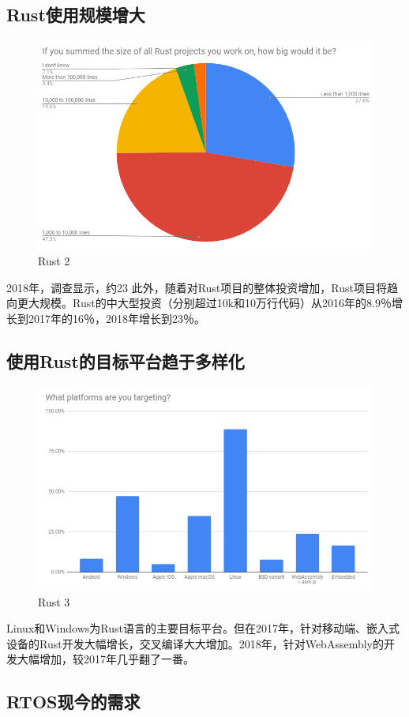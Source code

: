 \documentclass[12pt, a4paper]{article}
\begin{document}
	\subsection{Rust使用规模增大}
	
	\begin{figure}[H]
		\centering
		\includegraphics[width=0.7\linewidth]{n2}
		\caption{Rust 2}
		\label{fig:n2}
	\end{figure}
	2018年，调查显示，约23%
	此外，随着对Rust项目的整体投资增加，Rust项目将趋向更大规模。Rust的中大型投资（分别超过10k和10万行代码）从2016年的8.9％增长到2017年的16％，2018年增长到23％。    
	\subsection{使用Rust的目标平台趋于多样化}
	
	\begin{figure}[H]
		\centering
		\includegraphics[width=0.7\linewidth]{n3}
		\caption{Rust 3}
		\label{fig:n3}
	\end{figure}
	Linux和Windows为Rust语言的主要目标平台。但在2017年，针对移动端、嵌入式设备的Rust开发大幅增长，交叉编译大大增加。2018年，针对WebAssembly的开发大幅增加，较2017年几乎翻了一番。
	
	\subsection{RTOS现今的需求}
\end{document}
